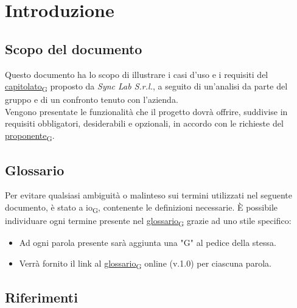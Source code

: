 \section{Introduzione}
\setcounter{subsection}{0}
\subsection{Scopo del documento}
Questo documento ha lo scopo di illustrare i casi d'uso e i requisiti del \href{https://7last.github.io/docs/rtb/documentazione-interna/glossario\#capitolato}{capitolato\textsubscript{G}}
proposto da \textit{Sync Lab S.r.l.}, a seguito di un'analisi da parte del gruppo
e di un confronto tenuto con l'azienda.\\
Vengono presentate le funzionalità che il progetto dovrà offrire, suddivise in requisiti obbligatori,
desiderabili e opzionali, in accordo con le richieste del \href{https://7last.github.io/docs/rtb/documentazione-interna/glossario\#proponente}{proponente\textsubscript{G}}.

\subsection{Glossario}
Per evitare qualsiasi ambiguità o malinteso sui termini utilizzati nel seguente documento,
è stato a io\textsubscript{G}, contenente le definizioni necessarie. È possibile individuare ogni termine presente
nel \href{https://7last.github.io/docs/rtb/documentazione-interna/glossario\#glossario}{glossario\textsubscript{G}}
grazie ad uno stile specifico:
\begin{itemize}
	\item Ad ogni parola presente sarà aggiunta una "G" al pedice della stessa.
	\item Verrà fornito il link al
	      \href{https://7last.github.io/docs/rtb/documentazione-interna/glossario\#glossario}{glossario\textsubscript{G}} online (v.1.0) per ciascuna parola.

\end{itemize}

\subsection{Riferimenti}
